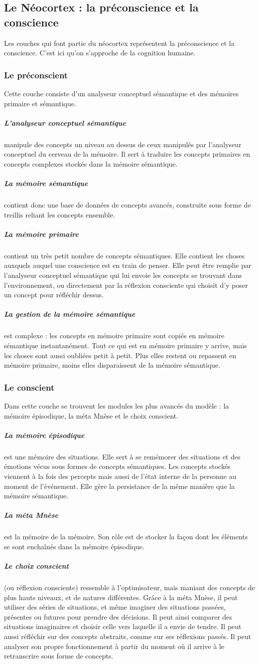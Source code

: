 \subsection{Le Néocortex : la préconscience et la conscience}
Les couches qui font partie du néocortex représentent la préconscience et la
conscience. C'est ici qu'on s'approche de la cognition humaine.
\subsubsection{Le préconscient} Cette couche consiste d'un analyseur
conceptuel sémantique et des mémoires primaire et sémantique.
\subparagraph{L'analyseur conceptuel sémantique} manipule des concepts un niveau
au dessus de ceux manipulés par l’analyseur conceptuel du cerveau de la mémoire. Il sert à
traduire les concepts primaires en concepts complexes stockés dans la mémoire
sémantique.
\subparagraph{La mémoire sémantique} contient donc une base de
données de concepts avancés, construite sous forme de treillis reliant les
concepts ensemble.
\subparagraph{La mémoire primaire} contient un très petit nombre de concepts
sémantiques. Elle contient les choses auxquels auquel une conscience est en
train de penser. Elle peut être remplie par l’analyseur conceptuel sémantique qui lui envoie les
concepts se trouvant dans l’environnement, ou directement par la réflexion
consciente qui choisit d’y poser un concept pour réfléchir dessus.
\subparagraph{La gestion de la mémoire sémantique} est complexe : les concepts
en mémoire primaire sont copiés en mémoire sémantique instantanément. Tout ce qui est en
mémoire primaire y arrive, mais les choses sont aussi oubliées petit à petit.
Plus elles restent ou repassent en mémoire primaire, moins elles disparaissent
de la mémoire sémantique.
\subsubsection{Le conscient} Dans cette couche se trouvent les modules les plus
avancés du modèle : la mémoire épisodique, la méta Mnèse  et le choix conscient.
\subparagraph{La mémoire épisodique} est une mémoire des situations. Elle sert à
se remémorer des situations et des émotions vécus sous formes de concepts sémantiques. Les
concepts stockés viennent à la fois des percepts mais aussi de l’état interne de
la personne au moment de l’événement. Elle gère la persistance de la même
manière que la mémoire sémantique.
\subparagraph{La méta Mnèse} est la mémoire de la mémoire. Son rôle est de stocker la
façon dont les éléments se sont enchaînés dans la mémoire épisodique.
\subparagraph{Le choix conscient} (ou réflexion consciente) ressemble à l'optimisateur,
mais maniant des concepts de plus hauts niveaux, et de natures différentes. Grâce à
la méta Mnèse, il peut utiliser des séries de situations, et même imaginer des
situations passées, présentes ou futures pour prendre des décisions. Il peut
ainsi comparer des situations imaginaires et choisir celle vers laquelle il a
envie de tendre. Il peut aussi réfléchir sur des concepts abstraits, comme sur
ses réflexions passés. Il peut analyser son propre fonctionnement à partir du
moment où il arrive à le retranscrire sous forme de concepts.
